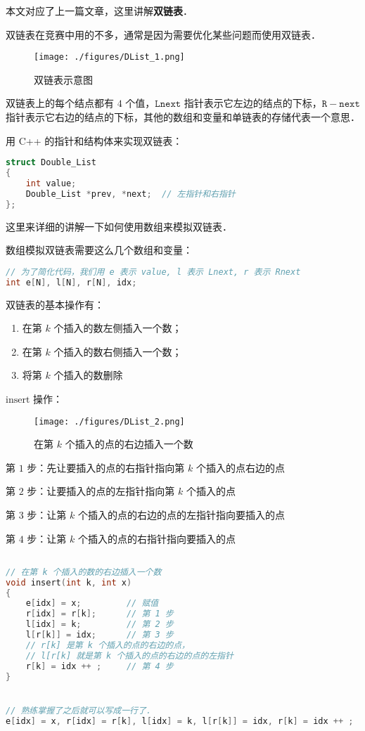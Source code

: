 
本文对应了上一篇文章，这里讲解\textbf{双链表}．

双链表在竞赛中用的不多，通常是因为需要优化某些问题而使用双链表．

\begin{figure}[ht]
\centering
\texttt{[image: ./figures/DList\_1.png]}
\caption{双链表示意图} \label{DList_fig1}
\end{figure}

双链表上的每个结点都有 $4$ 个值，$\mathtt{Lnext}$ 指针表示它左边的结点的下标，$\mathtt{R-next}$ 指针表示它右边的结点的下标，其他的数组和变量和单链表的存储代表一个意思．

用 C++ 的指针和结构体来实现双链表：
\begin{lstlisting}[language=cpp]
struct Double_List
{
    int value;
    Double_List *prev, *next;  // 左指针和右指针
};
\end{lstlisting}

这里来详细的讲解一下如何使用数组来模拟双链表．

数组模拟双链表需要这么几个数组和变量：
\begin{lstlisting}[language=cpp]
// 为了简化代码，我们用 e 表示 value, l 表示 Lnext, r 表示 Rnext
int e[N], l[N], r[N], idx;
\end{lstlisting}

双链表的基本操作有：\begin{enumerate}
\item 在第 $k$ 个插入的数左侧插入一个数；
\item 在第 $k$ 个插入的数右侧插入一个数；
\item 将第 $k$ 个插入的数删除
\end{enumerate}

$\text{insert}$ 操作：

\begin{figure}[ht]
\centering
\texttt{[image: ./figures/DList\_2.png]}
\caption{在第 $k$ 个插入的点的右边插入一个数} \label{DList_fig2}
\end{figure}

第 $1$ 步：先让要插入的点的右指针指向第 $k$ 个插入的点右边的点

第 $2$ 步：让要插入的点的左指针指向第 $k$ 个插入的点

第 $3$ 步：让第 $k$ 个插入的点的右边的点的左指针指向要插入的点

第 $4$ 步：让第 $k$ 个插入的点的右指针指向要插入的点


\begin{lstlisting}[language=cpp]

// 在第 k 个插入的数的右边插入一个数
void insert(int k, int x)
{
    e[idx] = x;         // 赋值
    r[idx] = r[k];      // 第 1 步
    l[idx] = k;         // 第 2 步
    l[r[k]] = idx;      // 第 3 步
    // r[k] 是第 k 个插入的点的右边的点，
    // l[r[k] 就是第 k 个插入的点的右边的点的左指针
    r[k] = idx ++ ;     // 第 4 步
}


// 熟练掌握了之后就可以写成一行了．
e[idx] = x, r[idx] = r[k], l[idx] = k, l[r[k]] = idx, r[k] = idx ++ ;

\end{lstlisting}

